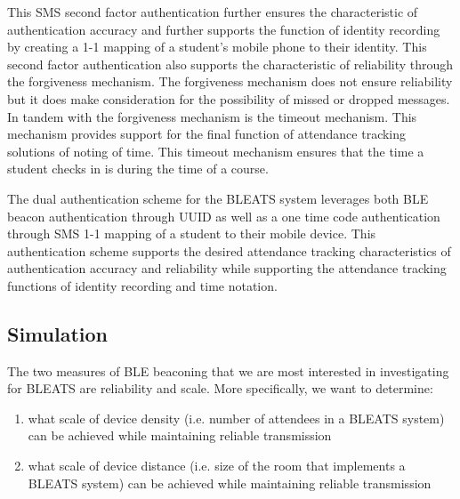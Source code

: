 This SMS second factor authentication further ensures the characteristic of
authentication accuracy and further supports the function of identity recording
by creating a 1-1 mapping of a student’s mobile phone to their identity.  This
second factor authentication also supports the characteristic of reliability
through the forgiveness mechanism. The forgiveness mechanism does not ensure
reliability but it does make consideration for the possibility of missed or
dropped messages. In tandem with the forgiveness mechanism is the timeout
mechanism. This mechanism provides support for the final function of attendance
tracking solutions of noting of time. This timeout mechanism ensures that the
time a student checks in is during the time of a course.

The dual authentication scheme for the BLEATS system leverages both BLE beacon
authentication through UUID as well as a one time code authentication through
SMS 1-1 mapping of a student to their mobile device. This authentication scheme
supports the desired attendance tracking characteristics of authentication
accuracy and reliability  while supporting the attendance tracking functions of
identity recording and time notation.

\subsection{Simulation} 

The two measures of BLE beaconing that we are most interested in investigating
for BLEATS are reliability and scale. More specifically, we want to determine:

\begin{enumerate}

\item what scale of device density (i.e. number of attendees in a BLEATS
system) can be achieved while maintaining reliable transmission

\item what scale of device distance (i.e. size of the room that implements a
BLEATS system) can be achieved while maintaining reliable transmission 

\end{enumerate}

